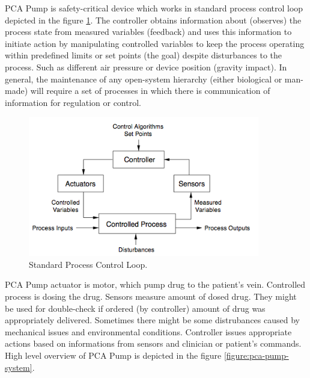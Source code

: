 PCA Pump is safety-critical device which works in standard process control loop depicted in the figure \ref{figure:control-loop}. The controller obtains information about (observes) the process state from measured variables (feedback) and uses this information to initiate action by manipulating controlled variables to keep the process operating within predefined limits or set points (the goal) despite disturbances to the process. Such as different air pressure or device position (gravity impact). In general, the maintenance of any open-system hierarchy (either biological or man-made) will require a set of processes in which there is communication of information for regulation or control. \cite{SaferWorld} 

\begin{figure}[ht]%
    \begin{center}
    	\includegraphics[width=0.9\textwidth]{figures/safety-critical-loop.png}    	
    \end{center}
    \caption{Standard Process Control Loop.}
    \label{figure:control-loop}
\end{figure}

PCA Pump actuator is motor, which pump drug to the patient's vein. Controlled process is dosing the drug. Sensors measure amount of dosed drug. They might be used for double-check if ordered (by controller) amount of drug was appropriately delivered. Sometimes there might be some distrubances caused by mechanical issues and environmental conditions. Controller issues appropriate actions based on informations from sensors and clinician or patient's commands. High level overview of PCA Pump is depicted in the figure \ref{figure:pca-pump-system}.

